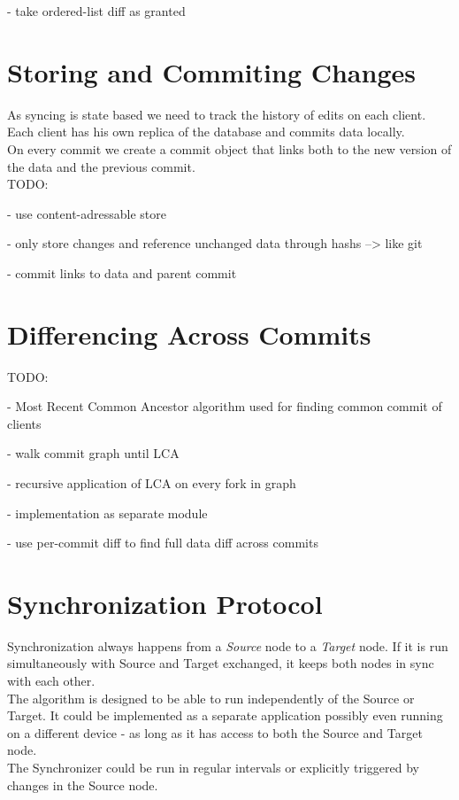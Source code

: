 - take ordered-list diff as granted

\section{Storing and Commiting Changes}
\label{main.committing}
As syncing is state based we need to track the history of edits on each client.\\Each client has his own replica of the database and commits
data locally.\\On every commit we create a commit object that links both
to the new version of the data and the previous commit.\\

TODO:

- use content-adressable store

- only store changes and reference unchanged data through hashs --> like git

- commit links to data and parent commit

\section{Differencing Across Commits}
\label{main.diff-across-commits}

TODO:

- Most Recent Common Ancestor algorithm used for finding common commit of clients

- walk commit graph until LCA

- recursive application of LCA on every fork in graph

- implementation as separate module

- use per-commit diff to find full data diff across commits

\section{Synchronization Protocol}
\label{sec:main.protocol}
Synchronization always happens from a \emph{Source} node to a \emph{Target} node.
If it is run simultaneously with Source and Target exchanged, it keeps both nodes in sync with each other.\\
The algorithm is designed to be able to run independently of the Source or Target.
It could be implemented as a separate application possibly even running on a different device - as long as it has access to both the Source and Target node.\\
The Synchronizer could be run in regular intervals or explicitly triggered by changes in the Source node.\\

